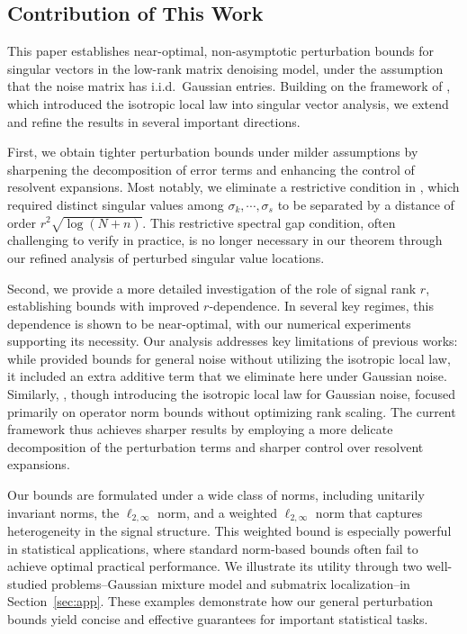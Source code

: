\documentclass[reqno]{amsart}
\theoremstyle{plain}
\theoremstyle{definition}
\begin{document}
\subsection{Contribution of This Work}\label{sec:ourcontribution}

This paper establishes near-optimal, non-asymptotic perturbation bounds for singular vectors in the low-rank matrix denoising model, under the assumption that the noise matrix has i.i.d.\ Gaussian entries. Building on the framework of \cite{OVW22}, which introduced the isotropic local law into singular vector analysis, we extend and refine the results in several important directions.

First, we obtain tighter perturbation bounds under milder assumptions by sharpening the decomposition of error terms and enhancing the control of resolvent expansions. 
Most notably, we eliminate a restrictive condition in \cite{OVW22}, which required distinct singular values among $\sigma_k,\cdots,\sigma_s$ to be separated by a distance of order $r^2\sqrt{\log(N+n)}$. This restrictive spectral gap condition, often challenging to verify in practice, is no longer necessary in our theorem through our refined analysis of perturbed singular value locations.

Second, we provide a more detailed investigation of the role of signal rank $r$, establishing bounds with improved $r$-dependence. In several key regimes, this dependence is shown to be near-optimal, with our numerical experiments supporting its necessity. Our analysis addresses key limitations of previous works: while \cite{OVW2} provided bounds for general noise without utilizing the isotropic local law, it included an extra additive term that we eliminate here under Gaussian noise. Similarly, \cite{OVW22}, though introducing the isotropic local law for Gaussian noise, focused primarily on operator norm bounds without optimizing rank scaling. The current framework thus achieves sharper results by employing a more delicate decomposition of the perturbation terms and sharper control over resolvent expansions. 

Our bounds are formulated under a wide class of norms, including unitarily invariant norms, the $\ell_{2,\infty}$ norm, and a weighted $\ell_{2,\infty}$ norm that captures heterogeneity in the signal structure. This weighted bound is especially powerful in statistical applications, where standard norm-based bounds often fail to achieve optimal practical performance. We illustrate its utility through two well-studied problems--Gaussian mixture model and submatrix localization--in Section~\ref{sec:app}. These examples demonstrate how our general perturbation bounds yield concise and effective guarantees for important statistical tasks.
\end{document}
